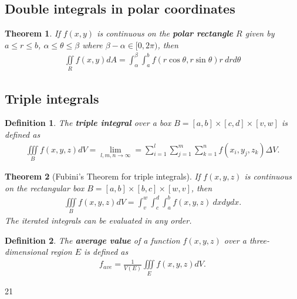 \documentclass{article}
\theoremstyle{sltheorem}
\newtheorem{definition}{Definition}[section]
\newtheorem{theorem}{Theorem}[section]
\newcommand{\di}{\iint\limits}
\newcommand{\ti}{\iiint\limits}
\newcommand*\B[1]{\textbf{#1}}
\begin{document}
\subsection{Double integrals in polar coordinates}
\begin{theorem}
    If $f(x,y)$ is continuous on the \B{polar rectangle} $R$
    given by $a\leq r \leq b$, $\alpha \leq \theta\leq \beta$ where
    $\beta-\alpha \in [0,2\pi)$, then
    \begin{align*}
        \di_R f(x,y)dA = \int_\alpha^\beta \int_a^b
        f(r\cos\theta, r\sin\theta)r\:drd\theta
    \end{align*}
\end{theorem}
\subsection{Triple integrals} 
\begin{definition}
    The \B{triple integral} over a box $B=[a,b]\times[c,d]\times[v,w]$
    is defined as
    \begin{align*}
        \ti_B f(x,y,z)dV = \lim_{l,m,n\to\infty}=\sum_{i=1}^l \sum_{j=1}^m \sum_{k=1}^n
        f(x_i,y_j,z_k)\Delta V.
    \end{align*}
\end{definition}
\begin{theorem}[Fubini's Theorem for triple integrals]
    If $f(x,y,z)$ is continuous on the rectangular box $B=[a,b]\times[b,c]\times[w,v]$,
    then 
    \begin{align*}
        \ti_B f(x,y,z) dV = \int_v^w\int_c^d \int_a^b f(x,y,z)\:dxdydx.
    \end{align*} 
    The iterated integrals can be evaluated in any order.
\end{theorem}
\begin{definition}
    The \B{average value} of a function $f(x,y,z)$ over a three-dimensional region $E$
    is defined as
    \begin{align*}
        f_{ave} = \frac{1}{V(E)}\ti_E f(x,y,z)dV.
    \end{align*} 
\end{definition}21
\end{document}

